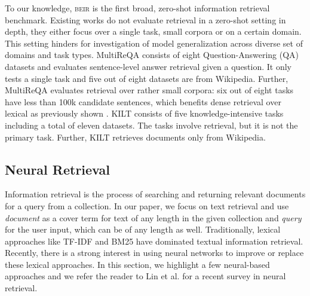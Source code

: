 \documentclass{article}
\newcommand{\custo}[1]{\textsc{\normalsize #1}}
\newcommand{\beir}{\custo{beir}\xspace}
\begin{document}
To our knowledge, \beir is the first broad, zero-shot information retrieval benchmark. Existing works \cite{guo2020multireqa, petroni2020kilt} do not evaluate retrieval in a zero-shot setting in depth, they either focus over a single task, small corpora or on a certain domain. This setting hinders for investigation of model generalization across diverse set of domains and task types. MultiReQA \cite{guo2020multireqa} consists of eight Question-Answering (QA) datasets and evaluates sentence-level answer retrieval given a question. It only tests a single task and five out of eight datasets are from Wikipedia. Further, MultiReQA evaluates retrieval over rather small corpora: six out of eight tasks have less than 100k candidate sentences, which benefits dense retrieval over lexical as previously shown  \cite{reimers2020curse}. 
KILT \cite{petroni2020kilt} consists of five knowledge-intensive tasks including a total of eleven datasets. The tasks involve retrieval, but it is not the primary task. Further, KILT retrieves documents only from Wikipedia. 

\vspace{-3mm}
\subsection{Neural Retrieval}\label{sec:neural_retrieval}
\vspace{-2mm}

Information retrieval is the process of searching and returning relevant documents for a query from a collection. In our paper, we focus on text retrieval and use \textit{document} as a cover term for text of any length in the given collection and \textit{query} for the user input, which can be of any length as well. Traditionally, lexical approaches like TF-IDF and BM25 \cite{bm25} have dominated textual information retrieval. Recently, there is a strong interest in using neural networks to improve or replace these lexical approaches. In this section, we highlight a few neural-based approaches and we refer the reader to Lin et al. \cite{lin2020pretrained} for a recent survey in neural retrieval.
\end{document}
